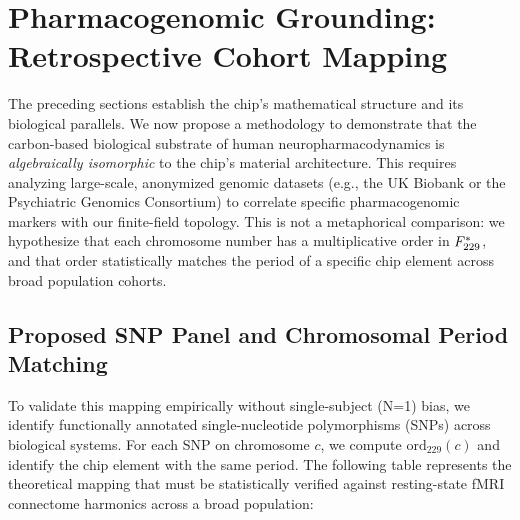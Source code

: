 \section{Pharmacogenomic Grounding: Retrospective Cohort Mapping}\label{sec:pharmacogenomic}

The preceding sections establish the chip's mathematical structure and its biological parallels. We now propose a methodology to demonstrate that the carbon-based biological substrate of human neuropharmacodynamics is {\em algebraically isomorphic} to the chip's material architecture. This requires analyzing large-scale, anonymized genomic datasets (e.g., the UK Biobank or the Psychiatric Genomics Consortium) to correlate specific pharmacogenomic markers with our finite-field topology. This is not a metaphorical comparison: we hypothesize that each chromosome number has a multiplicative order in $F_{229}^*$, and that order statistically matches the period of a specific chip element across broad population cohorts.

\subsection{Proposed SNP Panel and Chromosomal Period Matching}

To validate this mapping empirically without single-subject (N=1) bias, we identify functionally annotated single-nucleotide polymorphisms (SNPs) across biological systems. For each SNP on chromosome $c$, we compute $\mathrm{ord}_{229}(c)$ and identify the chip element with the same period. The following table represents the theoretical mapping that must be statistically verified against resting-state fMRI connectome harmonics across a broad population:


